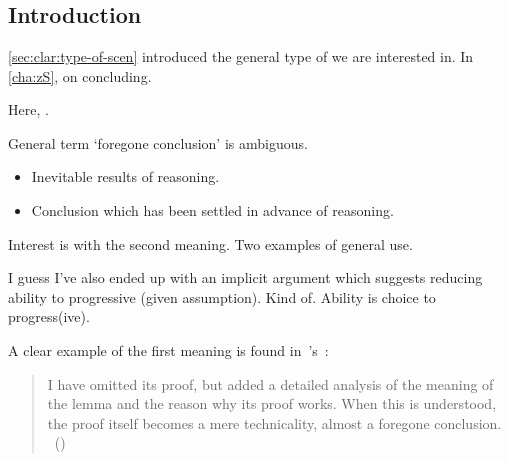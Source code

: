 \chapter{}
\label{cha:fcs}

\section{Introduction}
\label{cha:fcs:sec:introduction}

\begin{note}
  \autoref{sec:clar:type-of-scen} introduced the general type of \scen{} we are interested in.
  In \autoref{cha:zS},  on concluding.

  Here, .

  General term `foregone conclusion' is ambiguous.
  \begin{itemize}
    \item
    Inevitable results of reasoning.
  \item
    Conclusion which has been settled in advance of reasoning.
  \end{itemize}

  Interest is with the second meaning.
  Two examples of general use.

  I guess I've also ended up with an implicit argument which suggests reducing ability to progressive (given assumption).
  Kind of.
  Ability is choice to progress(ive).

  A clear example of the first meaning is found in~\citeauthor{Machover:1996vu}'s~:

  \begin{quote}
    I have omitted its proof, but added a detailed analysis of the meaning of the lemma and the reason why its proof works. When this is understood, the proof itself becomes a mere technicality, almost a foregone conclusion.%
    \mbox{ }\hfill\mbox{(\citeyear[viii]{Machover:1996vu})}
  \end{quote}


\end{note}
